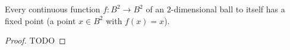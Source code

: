 \begin{theorem}[Brower's Fixpoint (for $n=2$)]
  \label{brower}
  Every continuous function $f : B^2 \longrightarrow B^2$ of an $2$-dimensional ball to
  itself has a fixed point (a point $x \in B^2$ with $f(x) = x$).
\end{theorem}
\begin{proof}
  TODO
\end{proof}
